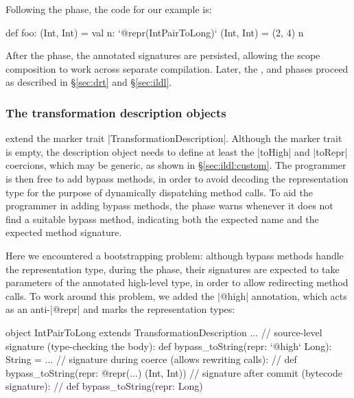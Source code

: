 \noindent Following the \inject{} phase, the code for our example is:

\begin{lstlisting-nobreak}
def foo: (Int, Int) = {
  val n: `@repr(IntPairToLong)` (Int, Int) = (2, 4)
  n
}
\end{lstlisting-nobreak}

\noindent
After the \inject{} phase, the annotated signatures are persisted, allowing the scope composition to work across separate compilation.
Later, the \bridge{}, \coerce{} and \commit{} phases proceed as described in \S\ref{sec:drt} and \S\ref{sec:ildl}.

\subsubsection{The transformation description objects} extend the marker trait |TransformationDescription|. Although the marker trait is empty, the description object needs to define at least the |toHigh| and |toRepr| coercions, which may be generic, as shown in \S\ref{sec:ildl:custom}. The programmer is then free to add bypass methods, in order to avoid decoding the representation type for the purpose of dynamically dispatching method calls. To aid the programmer in adding bypass methods, the \coerce{} phase warns whenever it does not find a suitable bypass method, indicating both the expected name and the expected method signature. 

Here we encountered a bootstrapping problem: although bypass methods handle the representation type, during the \coerce{} phase, their signatures are expected to take parameters of the annotated high-level type, in order to allow redirecting method calls. To work around this problem, we added the |@high| annotation, which acts as an anti-|@repr| and marks the representation types:

\begin{lstlisting-nobreak}
object IntPairToLong extends TransformationDescription{
  ...
  // source-level signature (type-checking the body):
  def bypass_toString(repr: `@high` Long): String = ...
  // signature during coerce (allows rewriting calls):
  //   def bypass_toString(repr: @repr(...) (Int, Int))
  // signature after commit (bytecode signature):
  //   def bypass_toString(repr: Long)
}
\end{lstlisting-nobreak}

